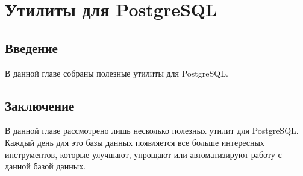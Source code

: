 \chapter{Утилиты для PostgreSQL}

\begin{epigraphs}
\end{epigraphs}

\section{Введение}

В данной главе собраны полезные утилиты для PostgreSQL.





\section{Заключение}

В данной главе рассмотрено лишь несколько полезных утилит для PostgreSQL. Каждый день для это базы данных появляется все больше интересных инструментов, которые улучшают, упрощают или автоматизируют работу с данной базой данных.
